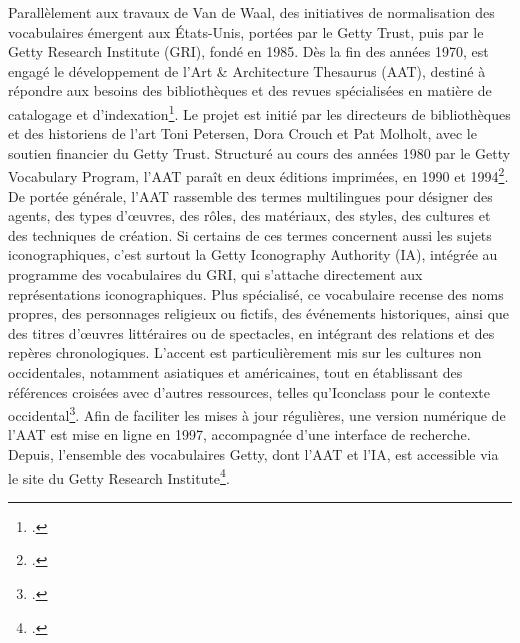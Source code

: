 Parallèlement aux travaux de Van de Waal, des initiatives de normalisation des vocabulaires émergent aux États-Unis, portées par le Getty Trust, puis par le Getty Research Institute (GRI), fondé en 1985. Dès la fin des années 1970, est engagé le développement de l’Art \& Architecture Thesaurus (AAT), destiné à répondre aux besoins des bibliothèques et des revues spécialisées en matière de catalogage et d’indexation\footcite{gettyresearchinstituteAAT2024}. Le projet est initié par les directeurs de bibliothèques et des historiens de l’art Toni Petersen, Dora Crouch et Pat Molholt,  avec le soutien financier du Getty Trust. Structuré au cours des années 1980 par le Getty Vocabulary Program, l’AAT paraît en deux éditions imprimées, en 1990 et 1994\footcite{petersenArtArchitectureThesaurus1990}. De portée générale, l’AAT rassemble des termes multilingues pour désigner des agents, des types d’œuvres, des rôles, des matériaux, des styles, des cultures et des techniques de création. Si certains de ces termes concernent aussi les sujets iconographiques, c’est surtout la Getty Iconography Authority (IA), intégrée au programme des vocabulaires du GRI, qui s’attache directement aux représentations iconographiques. Plus spécialisé, ce vocabulaire recense des noms propres, des personnages religieux ou fictifs, des événements historiques, ainsi que des titres d’œuvres littéraires ou de spectacles, en intégrant des relations et des repères chronologiques. L’accent est particulièrement mis sur les cultures non occidentales,  notamment asiatiques et américaines, tout en établissant des références croisées avec d’autres ressources, telles qu’Iconclass pour le contexte occidental\footcite{gettyresearchinstituteCONAIA2024}. Afin de faciliter les mises à jour régulières, une version numérique de l’AAT est mise en ligne en 1997, accompagnée d’une interface de recherche. Depuis, l’ensemble des vocabulaires Getty, dont l’AAT et l’IA, est accessible via le site du Getty Research Institute\footcite{gettyresearchinstituteGettyVocabularies}.


